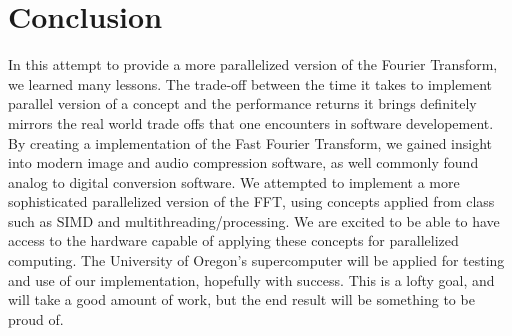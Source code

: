 \documentclass[12pt]{extarticle}
\begin{document}
\section*{Conclusion}
	In this attempt to provide a more parallelized version of the Fourier Transform, we learned many lessons. The trade-off between the time it takes to 
	implement parallel version of a concept and the performance returns it brings definitely mirrors the real world trade offs that one encounters in software
	developement. 
	By creating a implementation of the Fast Fourier Transform, we gained insight into modern image and audio compression software, as well commonly found analog to digital conversion software.
    We attempted to implement a more sophisticated parallelized version of the FFT, using concepts applied from class such as SIMD and multithreading/processing.
    We are excited to be able to have access to the hardware capable of applying these concepts for parallelized computing.
	The University of Oregon's supercomputer will be applied for testing and use of our implementation, hopefully with success. 
	This is a lofty goal, and will take a good amount of work, but the end result will be something to be proud of.


\end{document}
